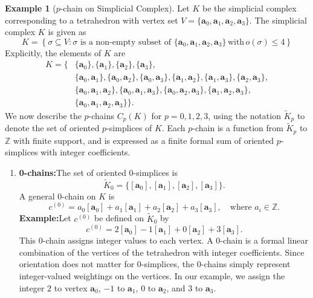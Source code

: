 \documentclass[12pt,oneside,reqno]{amsart}
\theoremstyle{plain}
\theoremstyle{definition}
\newtheorem{example}{Example}[section]
\theoremstyle{remark}
\newcommand{\0}{{\textbf{0}}}
\begin{document}
\begin{example}[$p$-chain on Simplicial Complex]\label{eg:p chain on Simplicial Complex}
Let $K$ be the simplicial complex corresponding to a tetrahedron with vertex set $V = \{\mathbf{a}_0, \mathbf{a}_1, \mathbf{a}_2, \mathbf{a}_3\}$. The simplicial complex $K$ is given as
\[
K = \left\{ \sigma \subseteq V \colon  \sigma \text{ is a non-empty subset of } \{\mathbf{a}_0, \mathbf{a}_1, \mathbf{a}_2, \mathbf{a}_3\} \, \text{with} \, o(\sigma) \leq 4 \right\}
\]
Explicitly, the elements of $K$ are
\[
\begin{aligned}
K = \{ & \{\mathbf{a}_0\}, \{\mathbf{a}_1\}, \{\mathbf{a}_2\}, \{\mathbf{a}_3\}, \\
& \{\mathbf{a}_0, \mathbf{a}_1\}, \{\mathbf{a}_0, \mathbf{a}_2\}, \{\mathbf{a}_0, \mathbf{a}_3\}, \{\mathbf{a}_1, \mathbf{a}_2\}, \{\mathbf{a}_1, \mathbf{a}_3\}, \{\mathbf{a}_2, \mathbf{a}_3\}, \\
& \{\mathbf{a}_0, \mathbf{a}_1, \mathbf{a}_2\}, \{\mathbf{a}_0, \mathbf{a}_1, \mathbf{a}_3\}, \{\mathbf{a}_0, \mathbf{a}_2, \mathbf{a}_3\}, \{\mathbf{a}_1, \mathbf{a}_2, \mathbf{a}_3\}, \\
& \{\mathbf{a}_0, \mathbf{a}_1, \mathbf{a}_2, \mathbf{a}_3\} \}.
\end{aligned}
\]
We now describe the $p$-chains $C_p(K)$ for $p = 0, 1, 2, 3$, using the notation $\widetilde{K}_p$ to denote the set of oriented $p$-simplices of $K$. Each $p$-chain is a function from $\widetilde{K}_p$ to $\mathbb{Z}$ with finite support, and is expressed as a finite formal sum of oriented $p$-simplices with integer coefficients.
\begin{enumerate}
\item \textbf{0-chains:}The set of oriented $0$-simplices is
\[
\widetilde{K}_0 = \{ [\mathbf{a}_0], [\mathbf{a}_1], [\mathbf{a}_2], [\mathbf{a}_3] \}.
\]
A general $0$-chain on $K$ is
\[
c^{(0)} = a_0 [\mathbf{a}_0] + a_1 [\mathbf{a}_1] + a_2 [\mathbf{a}_2] + a_3 [\mathbf{a}_3], \quad \text{where } a_i \in \mathbb{Z}.
\]
\textbf{Example:}Let $c^{(0)}$ be defined on $\widetilde{K}_0$ by
\[
c^{(0)} = 2[\mathbf{a}_0] - 1[\mathbf{a}_1] + 0[\mathbf{a}_2] + 3[\mathbf{a}_3].
\]
This 0-chain assigns integer values to each vertex. A $0$-chain is a formal linear combination of the vertices of the tetrahedron with integer coefficients. Since orientation does not matter for $0$-simplices, the 0-chains simply represent integer-valued weightings on the vertices. In our example, we assign the integer $2$ to vertex $\mathbf{a}_0$, $-1$ to $\mathbf{a}_1$, $0$ to $\mathbf{a}_2$, and $3$ to $\mathbf{a}_3$. 

\end{enumerate}
\end{example}
\end{document}
